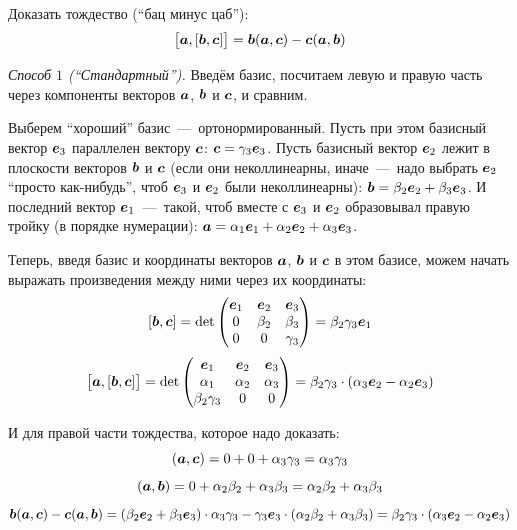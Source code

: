 \documentclass[a4paper,12pt]{article}
\begin{document}
  
  \begin{problem}[3.13(2)]
    Доказать тождество (``бац минус цаб''):
    \[
      \bigl[\boldsymbol a, [\boldsymbol b, \boldsymbol c]\bigr] = \boldsymbol b (\boldsymbol a, \boldsymbol c) - \boldsymbol c (\boldsymbol a, \boldsymbol b)
    \]
  \end{problem}
  
  \begin{solution}
    \leavevmode
    
    \emph{Способ $1$ (``Стандартный'').}
    Введём базис, посчитаем левую и правую часть через компоненты векторов $\boldsymbol a$, $\boldsymbol b$ и $\boldsymbol c$, и сравним.
    
    Выберем ``хороший'' базис~---~ортонормированный.
    Пусть при этом базисный вектор $\boldsymbol e_3$ параллелен вектору $\boldsymbol c$: $\bds c \hm= \gamma_3 \bds e_3$.
    Пусть базисный вектор $\boldsymbol e_2$ лежит в плоскости векторов $\boldsymbol b$ и $\boldsymbol c$ (если они неколлинеарны, иначе~---~надо выбрать $\boldsymbol e_2$ ``просто как-нибудь'', чтоб $\boldsymbol e_3$ и $\boldsymbol e_2$ были неколлинеарны): $\bds b \hm= \beta_2 \bds e_2 \hm+ \beta_3 \bds e_3$.
    И последний вектор $\boldsymbol e_1$~---~такой, чтоб вместе с $\boldsymbol e_3$ и $\boldsymbol e_2$ образовывал правую тройку (в порядке нумерации): $\bds a \hm= \alpha_1 \bds e_1 \hm+ \alpha_2 \bds e_2 \hm+ \alpha_3 \bds e_3$.
    
    Теперь, введя базис и координаты векторов $\boldsymbol a$, $\boldsymbol b$ и $\boldsymbol c$ в этом базисе, можем начать выражать произведения между ними через их координаты:
    \[
      [\boldsymbol b, \boldsymbol c] = \det \begin{pmatrix}
        \boldsymbol e_1 & \boldsymbol e_2 & \boldsymbol e_3\\
        0        & \beta_2  & \beta_3\\
        0        & 0        & \gamma_3
      \end{pmatrix}
      = \beta_2 \gamma_3 \boldsymbol e_1
    \]
    \[
      \bigl[\boldsymbol a, [\boldsymbol b, \boldsymbol c]\bigr] = \det \begin{pmatrix}
        \boldsymbol e_1         & \boldsymbol e_2 & \boldsymbol e_3\\
        \alpha_1         & \alpha_2 & \alpha_3\\
        \beta_2 \gamma_3 & 0        & 0
      \end{pmatrix}
      = \beta_2 \gamma_3 \cdot (\alpha_3 \boldsymbol e_2 - \alpha_2 \boldsymbol e_3)
    \]
    
    И для правой части тождества, которое надо доказать:
    \[
      (\boldsymbol a, \boldsymbol c) = 0 + 0 + \alpha_3 \gamma_3 = \alpha_3 \gamma_3
    \]
    \[
      (\boldsymbol a, \boldsymbol b) = 0 + \alpha_2 \beta_2 + \alpha_3 \beta_3 = \alpha_2 \beta_2 + \alpha_3 \beta_3
    \]
    \[
      \boldsymbol b (\boldsymbol a, \boldsymbol c) - \boldsymbol c (\boldsymbol a, \boldsymbol b)
        = (\beta_2 \boldsymbol e_2 + \beta_3 \boldsymbol e_3) \cdot \alpha_3 \gamma_3 - \gamma_3 \boldsymbol e_3 \cdot (\alpha_2 \beta_2 + \alpha_3 \beta_3)
        = \beta_2 \gamma_3 \cdot (\alpha_3 \boldsymbol e_2 - \alpha_2 \boldsymbol e_3)
    \]
    

\end{solution}
\end{document}
